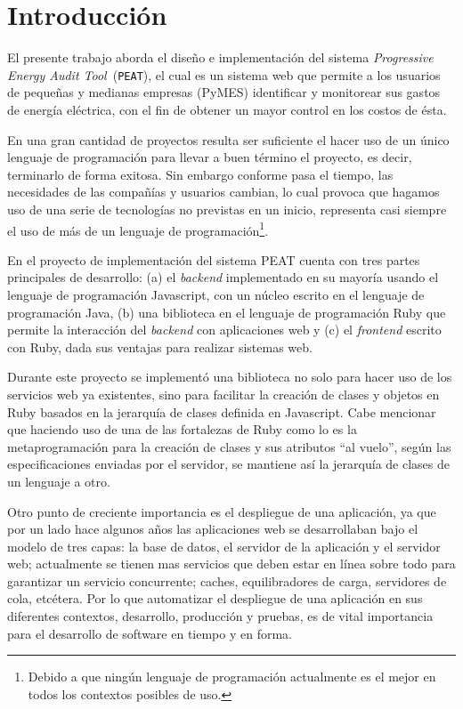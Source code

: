 \chapter*{Introducción}
El presente trabajo aborda el diseño e implementación del sistema \textit{Progressive
  Energy Audit Tool}\ (\texttt{PEAT}), el cual es un sistema web que permite
a los usuarios de pequeñas y medianas empresas (PyMES) identificar y monitorear
sus gastos de energía eléctrica, con el fin de obtener un mayor control
en los costos de ésta.

En una gran cantidad de proyectos resulta ser suficiente el hacer uso de un
único lenguaje de programación para llevar a buen término el proyecto, es decir,
terminarlo de forma exitosa. Sin embargo conforme pasa el tiempo, las necesidades
de las compañías y usuarios cambian, lo cual provoca que hagamos uso de una serie de
tecnologías no previstas en un inicio, representa casi siempre el uso
de más de un lenguaje de programación\footnote{Debido a que ningún
lenguaje de programación actualmente es el mejor en todos los contextos
posibles de uso.}.

En el proyecto de implementación del sistema PEAT cuenta con tres partes principales
de desarrollo: (a) el \textit{backend}  implementado en su mayoría usando
el lenguaje de programación Javascript, con un núcleo escrito en el lenguaje de
programación Java, (b) una biblioteca en el lenguaje de programación Ruby que permite
la interacción del \textit{backend} con aplicaciones web y (c) el \textit{frontend}
escrito con Ruby, dada sus ventajas para realizar sistemas web.

Durante este proyecto se implementó una biblioteca no solo para hacer uso de
los servicios web ya existentes, sino para facilitar la creación
de clases y objetos en Ruby basados en la jerarquía de clases definida
en Javascript. Cabe mencionar que haciendo uso de una de las fortalezas de Ruby
como lo es la metaprogramación para la creación de clases y sus
atributos ``al vuelo'', según las especificaciones enviadas por el servidor,
se mantiene así la jerarquía de clases de un lenguaje a otro.

Otro punto de creciente importancia es el despliegue de una aplicación, ya que por un
lado hace algunos años las aplicaciones web se desarrollaban bajo el modelo de
tres capas: la base de datos, el servidor de la aplicación y el servidor web;
actualmente se tienen mas servicios que deben estar en línea sobre todo para
garantizar un servicio concurrente; caches, equilibradores de carga, servidores
de cola, etcétera. Por lo que automatizar el despliegue de una aplicación en sus
diferentes contextos, desarrollo, producción y pruebas, es de vital importancia
para el desarrollo de software en tiempo y en forma.

